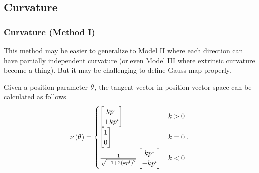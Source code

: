 \documentclass[stu, babel, american, biblatex, a4paper, leqno, draftall]{apa7}
\begin{document}
\subsection{Curvature}
\subsubsection{Curvature (Method I)}
This method may be easier to generalize to
Model II where each direction can have partially independent curvature
(or even Model III where extrinsic curvature become a thing).
But it may be challenging to define Gauss map properly.
\begin{lemma}\label{Model:NormalVector}
    Given a position parameter $\tensor{\theta}{}$,
    the tangent vector in position vector space can be calculated as follows
    \begin{equation*}
        \nu\left(\tensor{\theta}{}\right)
        =
        \begin{cases}
            \begin{bmatrix}
                k\tensor{p}{^1}  \\
                +k\tensor{p}{^i} \\
            \end{bmatrix} & k>0 \\
            \begin{bmatrix}
                1 \\
                0 \\
            \end{bmatrix} & k=0 \\
            \frac{1}{\sqrt{-1+2\left(k\tensor{p}{^1}\right)^2}}
            \begin{bmatrix}
                k\tensor{p}{^1}  \\
                -k\tensor{p}{^i} \\
            \end{bmatrix} & k<0
        \end{cases}
        \text{.}
    \end{equation*}
\end{lemma}
\end{document}
